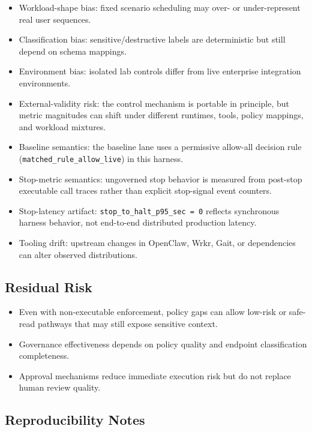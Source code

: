 \documentclass[
]{article}
\providecommand{\tightlist}{%
  \setlength{\itemsep}{0pt}\setlength{\parskip}{0pt}}
\begin{document}
\begin{itemize}
\tightlist
\item
  Workload-shape bias: fixed scenario scheduling may over- or
  under-represent real user sequences.
\item
  Classification bias: sensitive/destructive labels are deterministic
  but still depend on schema mappings.
\item
  Environment bias: isolated lab controls differ from live enterprise
  integration environments.
\item
  External-validity risk: the control mechanism is portable in
  principle, but metric magnitudes can shift under different runtimes,
  tools, policy mappings, and workload mixtures.
\item
  Baseline semantics: the baseline lane uses a permissive allow-all
  decision rule (\texttt{matched\_rule\_allow\_live}) in this harness.
\item
  Stop-metric semantics: ungoverned stop behavior is measured from
  post-stop executable call traces rather than explicit stop-signal
  event counters.
\item
  Stop-latency artifact: \texttt{stop\_to\_halt\_p95\_sec\ =\ 0}
  reflects synchronous harness behavior, not end-to-end distributed
  production latency.
\item
  Tooling drift: upstream changes in OpenClaw, Wrkr, Gait, or
  dependencies can alter observed distributions.
\end{itemize}

\subsection{Residual Risk}\label{residual-risk}

\begin{itemize}
\tightlist
\item
  Even with non-executable enforcement, policy gaps can allow low-risk
  or safe-read pathways that may still expose sensitive context.
\item
  Governance effectiveness depends on policy quality and endpoint
  classification completeness.
\item
  Approval mechanisms reduce immediate execution risk but do not replace
  human review quality.
\end{itemize}

\subsection{Reproducibility Notes}\label{reproducibility-notes}
\end{document}
